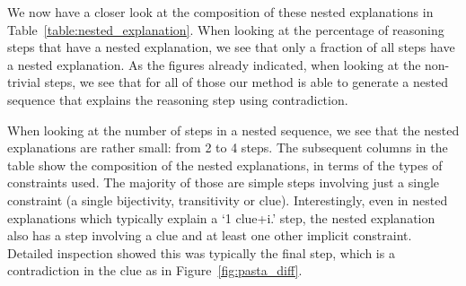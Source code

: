 We now have a closer look at the composition of these nested explanations in Table~\ref{table:nested_explanation}.
When looking at the percentage of reasoning steps that have a nested explanation, we see that only a fraction of all steps have a nested explanation. 
As the figures already indicated, when looking at the non-trivial steps, we see that for all of those our method is able to generate a nested sequence that explains the reasoning step using contradiction.




When looking at the number of steps in a nested sequence, we see that the nested explanations are rather small: from 2 to 4 steps.
The subsequent columns in the table show the composition of the nested explanations, in terms of the types of constraints used. 
The majority of those are simple steps involving just a single constraint (a single bijectivity, transitivity or clue). 
Interestingly, even in nested explanations which typically explain a `1 clue+i.' step, the nested explanation also has a step involving a clue and at least one other implicit constraint. 
Detailed inspection showed this was typically the final step, which is a contradiction in the clue as in Figure~\ref{fig:pasta_diff}.

